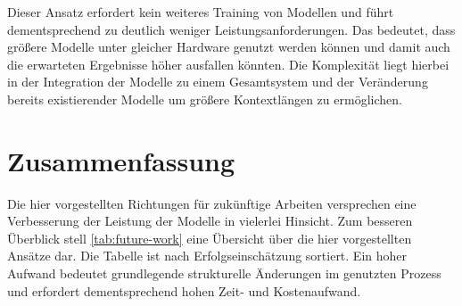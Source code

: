Dieser Ansatz erfordert kein weiteres Training von Modellen und führt dementsprechend zu deutlich weniger Leistungsanforderungen. Das bedeutet, dass größere Modelle unter gleicher Hardware genutzt werden können und damit auch die erwarteten Ergebnisse höher ausfallen könnten. Die Komplexität liegt hierbei in der Integration der Modelle zu einem Gesamtsystem und der Veränderung bereits existierender Modelle um größere Kontextlängen zu ermöglichen.

\section{Zusammenfassung}
Die hier vorgestellten Richtungen für zukünftige Arbeiten versprechen eine Verbesserung der Leistung der Modelle in vielerlei Hinsicht.
Zum besseren Überblick stell \cref{tab:future-work} eine Übersicht über die hier vorgestellten Ansätze dar.
Die Tabelle ist nach Erfolgseinschätzung sortiert.
Ein hoher Aufwand bedeutet grundlegende strukturelle Änderungen im genutzten Prozess und erfordert dementsprechend hohen Zeit- und Kostenaufwand.

\begin{table}
    \centering
    \caption[Verbesserungsansätze der Modelle]{Übersicht über mögliche Ansätze zur Verbesserung der Leistung der Modelle}\label{tab:future-work}
\end{table}
